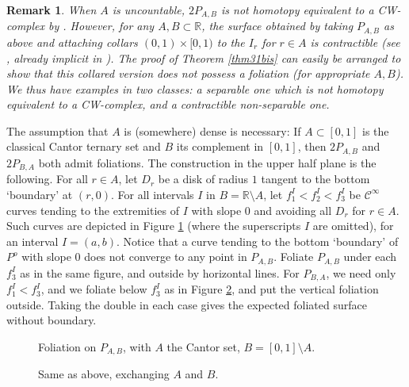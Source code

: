 \documentclass{amsart}
\newtheorem{rem}[theorem]{Remark}
\begin{document}
\begin{rem} 
{\rm When $A$ is uncountable, $2P_{A,B}$ is not homotopy equivalent to a CW-complex by \cite[Theorem 1] {MesziguesBridges}. However, for any $A,B\subset{\mathbb R}$, the surface obtained by taking $P_{A,B}$ as above and attaching collars $(0,1)\times[0,1)$ to the $I_r$ for $r\in A$ is contractible (see \cite[Proposition 3]{MesziguesBridges}, already implicit in \cite{CalabiRosenlicht}). The proof of Theorem \ref{thm31bis} can easily be arranged to show that this collared version does not possess a foliation (for appropriate $A,B$). We thus have examples in two classes: a separable one which is not homotopy equivalent to a CW-complex, and a contractible non-separable one.}
\end{rem}

\medskip

The assumption that $A$ is (somewhere) dense is necessary: If $A\subset[0,1]$ is the classical Cantor ternary set and $B$ its complement in $[0,1]$, then $2P_{A,B}$ and $2P_{B,A}$ both admit foliations. The construction in the upper half plane is the following. For all $r\in A$, let $D_r$ be a disk of radius $1$ tangent to the bottom `boundary' at $(r,0)$. For all intervals $I$ in $B={\mathbb R} \setminus A$, let $f_1^I < f_2^I < f_3^I$ be $\mathcal{C}^\infty$ curves tending to the extremities of $I$ with slope $0$ and avoiding all $D_r$ for $r\in A$. Such curves are depicted in Figure \ref{fig10} (where the superscripts $I$ are omitted), for an interval $I=(a,b)$. Notice that a curve tending to the bottom `boundary' of $P^o$ with slope 0 does not converge to any point in $P_{A,B}$. Foliate $P_{A,B}$ under each $f^I_3$ as in the same figure, and outside by horizontal lines. For $P_{B,A}$, we need only $f_1^I<f_3^I$, and we foliate below $f_3^I$ as in Figure \ref{fig11}, and put the vertical foliation outside. Taking the double in each case gives the expected foliated surface without boundary.

\begin{figure}[h]
\centering
    \caption{\label{fig10} Foliation on $P_{A,B}$, with $A$ the Cantor set, $B=[0,1] \setminus A$.}
\end{figure}

\begin{figure}[h]
\centering
    \caption{\label{fig11} Same as above, exchanging $A$ and $B$.}
\end{figure}
\end{document}
